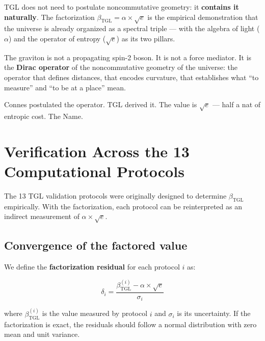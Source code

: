 \documentclass[12pt,a4paper,twoside]{article}
\newcommand{\betatgl}{\beta_{\!\scriptscriptstyle\mathrm{TGL}}}
\begin{document}
\begin{conclusionbox}[title={The graviton is the Dirac operator of the universe}]
TGL does not need to postulate noncommutative geometry: it \textbf{contains it naturally}. The factorization $\betatgl = \alpha \times \sqrt{e}$ is the empirical demonstration that the universe is already organized as a spectral triple --- with the algebra of light ($\alpha$) and the operator of entropy ($\sqrt{e}$) as its two pillars.

\medskip
The graviton is not a propagating spin-2 boson. It is not a force mediator. It is the \textbf{Dirac operator} of the noncommutative geometry of the universe: the operator that defines distances, that encodes curvature, that establishes what ``to measure'' and ``to be at a place'' mean.

\medskip
Connes postulated the operator. TGL derived it. The value is $\sqrt{e}$ --- half a nat of entropic cost. The Name.
\end{conclusionbox}



\section{Verification Across the 13 Computational Protocols}
\label{sec:protocolos}

The 13 TGL validation protocols \cite{Miguel2026Fronteira, Miguel2026LastString, Miguel2026GitHub} were originally designed to determine $\betatgl$ empirically. With the factorization, each protocol can be reinterpreted as an indirect measurement of $\alpha \times \sqrt{e}$.

\subsection{Convergence of the factored value}

We define the \textbf{factorization residual} for each protocol $i$ as:

\begin{equation}
\delta_i = \frac{\betatgl^{(i)} - \alpha \times \sqrt{e}}{\sigma_i}
\label{eq:residuo}
\end{equation}

\noindent where $\betatgl^{(i)}$ is the value measured by protocol $i$ and $\sigma_i$ is its uncertainty. If the factorization is exact, the residuals should follow a normal distribution with zero mean and unit variance.
\end{document}
